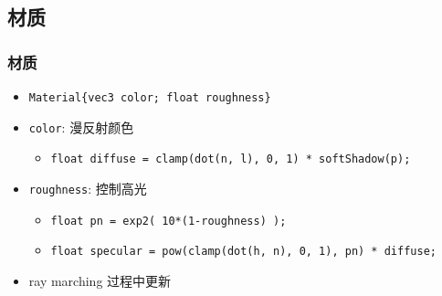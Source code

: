 \documentclass[aspectratio=169]{ctexbeamer} %
\begin{document}
\subsection{材质}
\begin{frame}
    \frametitle{材质}
    \begin{itemize}
        \item \texttt{Material\{vec3 color; float roughness\}}
        \item \texttt{color}: 漫反射颜色
        \begin{itemize}
            \item \texttt{float diffuse = clamp(dot(n, l), 0, 1) * softShadow(p);}
        \end{itemize}
        \item \texttt{roughness}: 控制高光
        \begin{itemize}
            \item \texttt{float pn = exp2( 10*(1-roughness) );}
            \item \texttt{float specular = pow(clamp(dot(h, n), 0, 1), pn) * diffuse;}
        \end{itemize}
        \item ray marching 过程中更新
    \end{itemize}
\end{frame}
\end{document}
